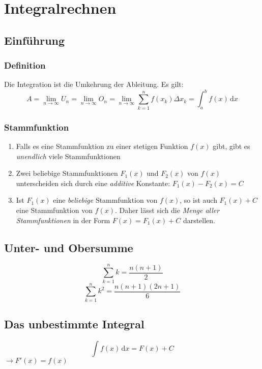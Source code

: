 \chapter{Integralrechnen}

\section{Einführung} %
\label{sec:einführung}

\subsection{Definition} %
\label{sub:definition}
Die Integration ist die Umkehrung der Ableitung.
Es gilt:
\[A = \lim\limits_{n \rightarrow \infty}U_n = \lim\limits_{n \rightarrow \infty}O_n = \lim\limits_{n \rightarrow \infty}\sum_{k=1}^{n} f(x_k) \Delta x_k = \int_a^b f(x)\,\mathrm{d}x \]
\subsection{Stammfunktion} %
\begin{enumerate}
	\item Falls es eine Stammfunktion zu einer stetigen Funktion \(f(x)\) gibt, gibt es \emph{unendlich} viele Stammfunktionen
	\item Zwei beliebige Stammfunktionen \(F_1 (x)\) und \(F_2 (x)\) von \(f(x)\) unterscheiden sich durch eine \emph{additive} Konstante: \(F_1 (x) - F_2 (x) = C\)
	\item Ist \(F_1 (x)\) eine \emph{beliebige} Stammfunktion von \(f (x)\), so ist auch \(F_1 (x) + C\) eine Stammfunktion von \(f (x)\). Daher lässt sich die \emph{Menge aller Stammfunktionen} in der Form \(F(x) = F_1 (x) + C \) darstellen.
\end{enumerate}

\section{Unter- und Obersumme}
\[ \sum_{k=1}^{n} k = \frac{n(n+1)}{2} \]
\[ \sum_{k=1}^{n} k^2 = \frac{n(n+1)(2n+1)}{6} \]

\section{Das unbestimmte Integral} %
\label{sec:das_unbestimmte_integral}
\[ \int f(x)\,\mathrm{d}x = F(x) + C \] \(\rightarrow F'(x) = f(x) \)

